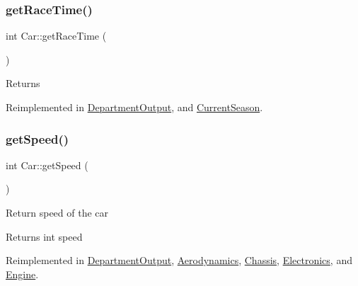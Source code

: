 \mbox{\label{classCar_ac30e13eba209c1ca3bba99bf6741094a}} 
\subsubsection{\texorpdfstring{get\+Race\+Time()}{getRaceTime()}}
{\footnotesize\ttfamily int Car\+::get\+Race\+Time (\begin{DoxyParamCaption}{ }\end{DoxyParamCaption})\hspace{0.3cm}{\ttfamily [virtual]}}

\begin{DoxyReturn}{Returns}

\end{DoxyReturn}


Reimplemented in \hyperlink{classDepartmentOutput_af4807c0cdde8488cd922be5d15a0f59b}{Department\+Output}, and \hyperlink{classCurrentSeason_a15328f2c4192d344e970ce111a96946f}{Current\+Season}.

\mbox{\label{classCar_a18e48b5cf9815216b8e82351d36b8d9f}} 
\subsubsection{\texorpdfstring{get\+Speed()}{getSpeed()}}
{\footnotesize\ttfamily int Car\+::get\+Speed (\begin{DoxyParamCaption}{ }\end{DoxyParamCaption})\hspace{0.3cm}{\ttfamily [virtual]}}

Return speed of the car \begin{DoxyReturn}{Returns}
int speed 
\end{DoxyReturn}


Reimplemented in \hyperlink{classDepartmentOutput_a90caf8934a687d18b9855f19a421ecef}{Department\+Output}, \hyperlink{classAerodynamics_aeee4abded0da2a826af0f3a4c0cdf991}{Aerodynamics}, \hyperlink{classChassis_a095c63aa079ebd8d7fc04f238fd1e56c}{Chassis}, \hyperlink{classElectronics_a09912c940a0a8656d97f8597b766c0eb}{Electronics}, and \hyperlink{classEngine_a5f828ac1355f02d43f8bae90fbddb131}{Engine}.

\mbox{\label{classCar_ae502eb1c04753317ebdb759497fd030c}} 
